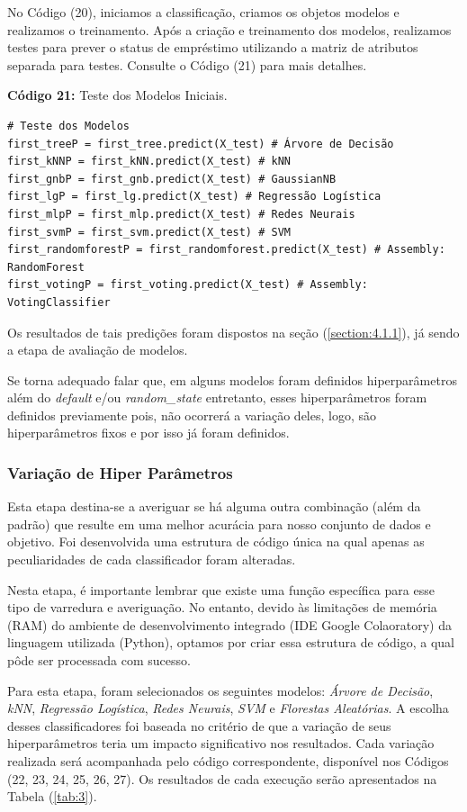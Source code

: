 \documentclass[a4paper,12pt]{article} %
\begin{document}
No Código (20), iniciamos a classificação, criamos os objetos modelos e realizamos o treinamento. Após a criação e treinamento dos modelos, realizamos testes para prever o status de empréstimo utilizando a matriz de atributos separada para testes. Consulte o Código (21) para mais detalhes.

\begin{center}
\textbf{Código 21:} Teste dos Modelos Iniciais.
\begin{verbatim}
# Teste dos Modelos
first_treeP = first_tree.predict(X_test) # Árvore de Decisão
first_kNNP = first_kNN.predict(X_test) # kNN
first_gnbP = first_gnb.predict(X_test) # GaussianNB
first_lgP = first_lg.predict(X_test) # Regressão Logística
first_mlpP = first_mlp.predict(X_test) # Redes Neurais
first_svmP = first_svm.predict(X_test) # SVM
first_randomforestP = first_randomforest.predict(X_test) # Assembly: RandomForest
first_votingP = first_voting.predict(X_test) # Assembly: VotingClassifier
\end{verbatim}
\end{center}

Os resultados de tais predições foram dispostos na seção (\ref{section:4.1.1}), já sendo a etapa de avaliação de modelos.

Se torna adequado falar que, em alguns modelos foram definidos hiperparâmetros além do \textit{default} e/ou \textit{random\_state} entretanto, esses hiperparâmetros foram definidos previamente pois, não ocorrerá a variação deles, logo, são hiperparâmetros fixos e por isso já foram definidos.

\subsubsection{Variação de Hiper Parâmetros}
Esta etapa destina-se a averiguar se há alguma outra combinação (além da padrão) que resulte em uma melhor acurácia para nosso conjunto de dados e objetivo. Foi desenvolvida uma estrutura de código única na qual apenas as peculiaridades de cada classificador foram alteradas.

Nesta etapa, é importante lembrar que existe uma função específica para esse tipo de varredura e averiguação. No entanto, devido às limitações de memória (RAM) do ambiente de desenvolvimento integrado (IDE Google Colaoratory) da linguagem utilizada (Python), optamos por criar essa estrutura de código, a qual pôde ser processada com sucesso.

Para esta etapa, foram selecionados os seguintes modelos: \textit{Árvore de Decisão}, \textit{kNN}, \textit{Regressão Logística}, \textit{Redes Neurais}, \textit{SVM} e \textit{Florestas Aleatórias}. A escolha desses classificadores foi baseada no critério de que a variação de seus hiperparâmetros teria um impacto significativo nos resultados. Cada variação realizada será acompanhada pelo código correspondente, disponível nos Códigos (22, 23, 24, 25, 26, 27). Os resultados de cada execução serão apresentados na Tabela (\ref{tab:3}).
\end{document}
